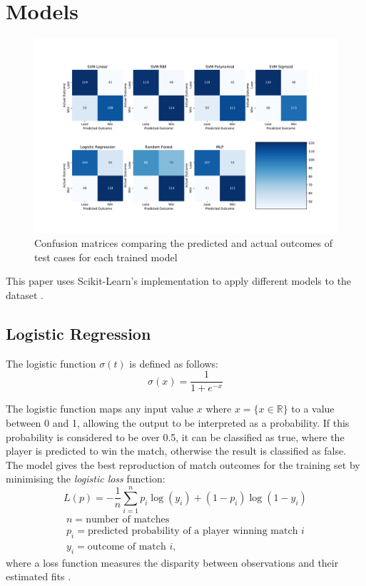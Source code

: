 \section{Models} \label{models}
\begin{figure}[ht]

\centering
\includegraphics[width=\textwidth]{plots/confusionmatrices.pdf}
\vspace{-2em}

\caption{Confusion matrices comparing the predicted and actual outcomes of test cases for each trained model}

\label{confusionmatricesr2}
\centering
\end{figure}

This paper uses Scikit-Learn's implementation to apply different models to the dataset \cite{pedregosa2011scikit}.

\subsection{Logistic Regression}
The logistic function $\sigma(t)$ is defined as follows:
$$
\sigma(x) = \frac{1}{1+e^{-x}}
$$

The logistic function maps any input value $x$ where $x = \{x\in \mathbb{R} \}$ to a value between 0 and 1, allowing the output to be interpreted as a probability. If this probability is considered to be over 0.5, it can be classified as true, where the player is predicted to win the match, otherwise the result is classified as false. The model gives the best reproduction of match outcomes for the training set by minimising the \textit{logistic loss} function:
$$
L(p) = -\frac{1}{n} \sum_{i=1}^n p_i \log(y_i) + (1-p_i)\log(1-y_i)
$$
\begin{equation*}
\begin{gathered}
    n = \text{number of matches} \\
    p_i = \text{predicted probability of a player winning match $i$} \\
    y_i = \text{outcome of match $i$},
\end{gathered}
\end{equation*}
where a loss function measures the disparity between observations and their estimated fits \cite{hazan2014logistic}.

